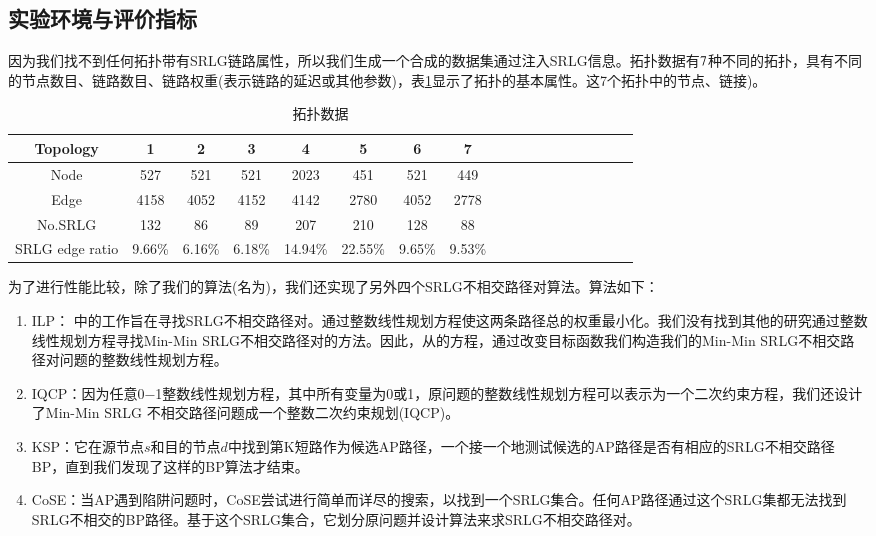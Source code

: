 
\subsection{实验环境与评价指标}

因为我们找不到任何拓扑带有SRLG链路属性，所以我们生成一个合成的数据集通过注入SRLG信息。拓扑数据有$7$种不同的拓扑，具有不同的节点数目、链路数目、链路权重(表示链路的延迟或其他参数)，表\ref{tab:AllSample}显示了拓扑的基本属性。这7个拓扑中的节点、链接)。

\begin{table}[htbp]
\caption{拓扑数据}
  \centering
\footnotesize{  \begin{tabular}{*{18}{c}}
\toprule
Topology & 1 & 2 & 3 & 4 & 5 & 6& 7   \\
\midrule
Node    &     527&      521    &      521     &    2023             &     451     &     521     &     449       \\
Edge   &    4158 &  4052     &    4152      &   4142          &       2780   &      4052   &      2778    \\
No.SRLG & 132 &  86   &  89  &  207        & 210  &  128  &   88    \\
SRLG edge ratio & 9.66\% & 6.16\% &   6.18\% &   14.94\%    &   22.55\%  &  9.65\% &   9.53\%     \\
\bottomrule
\end{tabular}
}
\label{tab:AllSample}
\end{table}

为了进行性能比较，除了我们的算法(名为\CI)，我们还实现了另外四个SRLG不相交路径对算法。算法如下：
\begin{enumerate}
  \item ILP：\cite{hu2003diverse} 中的工作旨在寻找SRLG不相交路径对。通过整数线性规划方程使这两条路径总的权重最小化。我们没有找到其他的研究通过整数线性规划方程寻找Min-Min SRLG不相交路径对的方法。因此，从\cite{hu2003diverse}的方程，通过改变目标函数我们构造我们的Min-Min SRLG不相交路径对问题的整数线性规划方程。
  \item IQCP：因为任意0−1整数线性规划方程，其中所有变量为0或1，原问题的整数线性规划方程可以表示为一个二次约束方程，我们还设计了Min-Min SRLG 不相交路径问题成一个整数二次约束规划(IQCP)\cite{hu2003diverse}。
  \item KSP\cite{eppstein1998finding}：它在源节点$s$和目的节点$d$中找到第K短路作为候选AP路径，一个接一个地测试候选的AP路径是否有相应的SRLG不相交路径BP，直到我们发现了这样的BP算法才结束。
  \item CoSE\cite{rostami2007cose}：当AP遇到陷阱问题时，CoSE尝试进行简单而详尽的搜索，以找到一个SRLG集合。任何AP路径通过这个SRLG集都无法找到SRLG不相交的BP路径。基于这个SRLG集合，它划分原问题并设计算法来求SRLG不相交路径对。
\end{enumerate}


